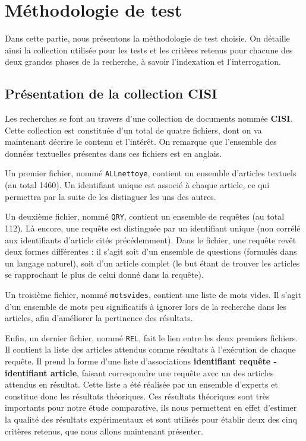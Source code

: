 \section{Méthodologie de test}

Dans cette partie, nous présentons la méthodologie de test choisie. On détaille ainsi la collection utilisée pour les tests et les critères retenus pour chacune des deux grandes phases de la recherche, à savoir l’indexation et l’interrogation.

\subsection{Présentation de la collection CISI}
\label{section:presentationCISI}
Les recherches se font au travers d'une collection de documents nommée \textbf{CISI}. Cette collection est constituée d’un total de quatre fichiers, dont on va maintenant décrire le contenu et l’intérêt. On remarque que l’ensemble des données textuelles présentes dans ces fichiers est en anglais.

Un premier fichier, nommé \texttt{ALLnettoye}, contient un ensemble d'articles textuels (au total 1460). Un identifiant unique est associé à chaque article, ce qui permettra par la suite de les distinguer les uns des autres.

Un deuxième fichier, nommé \texttt{QRY}, contient un ensemble de requêtes (au total 112). Là encore, une requête est distinguée par un identifiant unique (non corrélé aux identifiants d’article cités précédemment). Dans le fichier, une requête revêt deux formes différentes : il s’agit soit d’un ensemble de questions (formulés dans un langage naturel), soit d’un article complet (le but étant de trouver les articles se rapprochant le plus de celui donné dans la requête). 

Un troisième fichier, nommé \texttt{motsvides}, contient une liste de mots vides. Il s’agit d’un ensemble de mots peu significatifs à ignorer lors de la recherche dans les articles, afin d’améliorer la pertinence des résultats.

Enfin, un dernier fichier, nommé \texttt{REL}, fait le lien entre les deux premiers fichiers. Il contient la liste des articles attendus comme résultats à l'exécution de chaque requête. Il prend la forme d'une liste d'associations \textbf{identifiant requête - identifiant article}, faisant correspondre une requête avec un des articles attendus en résultat. Cette liste a été réalisée par un ensemble d'experts et constitue donc les résultats théoriques. Ces résultats théoriques sont très importants pour notre étude comparative, ils nous permettent en effet d’estimer la qualité des résultats expérimentaux et sont utilisés pour établir deux des cinq critères retenus, que nous allons maintenant présenter.

